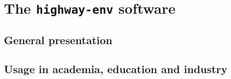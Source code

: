 
\chapter{The \texttt{highway-env} software}

\label{chapter:a}

\section{General presentation}
\section{Usage in academia, education and industry}